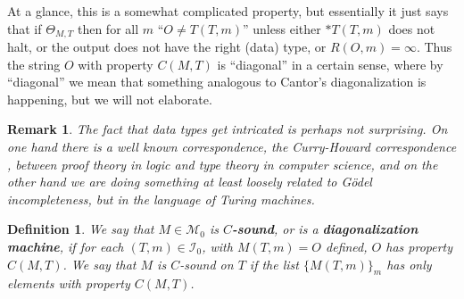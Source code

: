 \documentclass{amsart}  %
\numberwithin{equation}{section}
\newtheorem{remark}[equation]{Remark}
\newtheorem{definition}[equation]{Definition}
\theoremstyle{definition}
\theoremstyle{remark}
\begin{document}
{   At a glance, this is a somewhat complicated property,  but essentially it just says that if $\Theta _{M,T} $ then for all $m$  ``$O \neq T (T, m)$'' unless either $*  T (T,m)$ does not halt, or the output does not have the right (data) type, or $R (O,m) = \infty$.  Thus the string $O$ with property $C (M,T)$ is ``diagonal'' in a certain sense, where  by ``diagonal'' we mean that something analogous to Cantor's diagonalization is happening, but we will not elaborate. 
   \begin{remark}
   The fact that data types get intricated is perhaps not surprising. On one hand there is a well known correspondence, the Curry-Howard correspondence \cite{citeCurry}, between proof theory in logic and type theory in computer science, and on the other hand we are doing something at least loosely related to G\"odel incompleteness, but in the language of Turing machines.
\end{remark}
\begin{definition} \label{def:Psound}
   We say that $M \in \mathcal{M} _{0} $ is \textbf{\emph{$C$-sound}}, or 
is a \textbf{\emph{diagonalization machine}}, if for each $(T,m) \in \mathcal{I} _{0} $, with $M (T,m) = O$  defined,  $O$ has property $C (M,T)$.  We say that $M$ is $C$-sound on $T$ if the list $\{M (T,m)\} _{m} $ has only elements with property $C (M,T)$. 
 \end{definition}



}
\end{document}
